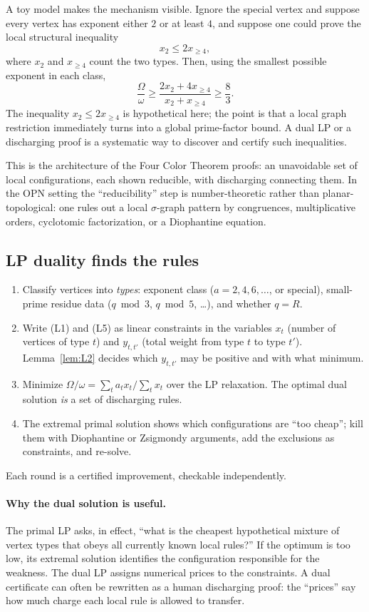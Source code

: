 \documentclass[11pt]{article}
\theoremstyle{definition}
\theoremstyle{remark}
\begin{document}
A toy model makes the mechanism visible.  Ignore the special vertex and
suppose every vertex has exponent either $2$ or at least $4$, and suppose one
could prove the local structural inequality
\[
x_2\le2x_{\ge4},
\]
where $x_2$ and $x_{\ge4}$ count the two types.  Then, using the smallest
possible exponent in each class,
\[
\frac{\Omega}{\omega}
\ge \frac{2x_2+4x_{\ge4}}{x_2+x_{\ge4}}
\ge \frac83.
\]
The inequality $x_2\le2x_{\ge4}$ is hypothetical here; the point is that a
local graph restriction immediately turns into a global prime-factor bound.
A dual LP or a discharging proof is a systematic way to discover and certify
such inequalities.

This is the architecture of the Four Color Theorem proofs: an unavoidable
set of local configurations, each shown reducible, with discharging
connecting them.  In the OPN setting the ``reducibility'' step is
number-theoretic rather than planar-topological: one rules out a local
$\sigma$-graph pattern by congruences, multiplicative orders, cyclotomic
factorization, or a Diophantine equation.

\subsection{LP duality finds the rules}

\begin{enumerate}[leftmargin=1.5em]
\item Classify vertices into \emph{types}: exponent class
  ($a=2,4,6,\dots$, or special), small-prime residue data
  ($q\bmod3$, $q\bmod5$, \dots), and whether $q=R$.
\item Write (L1) and (L5) as linear constraints in the variables
  $x_t$ (number of vertices of type $t$) and $y_{t,t'}$ (total weight
  from type $t$ to type $t'$). Lemma~\ref{lem:L2} decides which
  $y_{t,t'}$ may be positive and with what minimum.
\item Minimize $\Omega/\omega=\sum_t a_t x_t/\sum_t x_t$ over the LP
  relaxation. The optimal dual solution \emph{is} a set of discharging
  rules.
\item The extremal primal solution shows which configurations are
  ``too cheap''; kill them with Diophantine or Zsigmondy arguments,
  add the exclusions as constraints, and re-solve.
\end{enumerate}
Each round is a certified improvement, checkable independently.

\paragraph{Why the dual solution is useful.}
The primal LP asks, in effect, ``what is the cheapest hypothetical mixture of
vertex types that obeys all currently known local rules?''  If the optimum is
too low, its extremal solution identifies the configuration responsible for
the weakness.  The dual LP assigns numerical prices to the constraints.  A
dual certificate can often be rewritten as a human discharging proof: the
``prices'' say how much charge each local rule is allowed to transfer.
\end{document}
